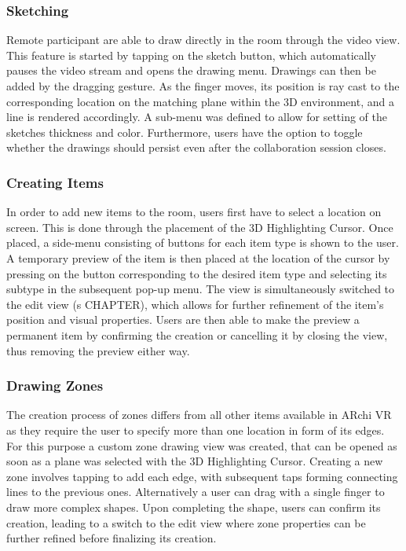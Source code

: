\documentclass{article}
\begin{document}
\subsubsection{Sketching}
Remote participant are able to draw directly in the room through the video view. This feature is started by tapping on the sketch button, which automatically pauses the video stream and opens the drawing menu. Drawings can then be added by the dragging gesture. As the finger moves, its position is ray cast to the corresponding location on the matching plane within the 3D environment, and a line is rendered accordingly. 
A sub-menu was defined to allow for setting of the sketches thickness and color. Furthermore, users have the option to toggle whether the drawings should persist even after the collaboration session closes.

\subsubsection{Creating Items}
In order to add new items to the room, users first have to select a location on screen. This is done through the placement of the 3D Highlighting Cursor. Once placed, a side-menu consisting of buttons for each item type is shown to the user. A temporary preview of the item is then placed at the location of the cursor by pressing on the button corresponding to the desired item type and selecting its subtype in the subsequent pop-up menu. 
The view is simultaneously switched to the edit view (s CHAPTER), which allows for further refinement of the item's position and visual properties. Users are then able to make the preview a permanent item by confirming the creation or cancelling it by closing the view, thus removing the preview either way.

\subsubsection{Drawing Zones}
The creation process of zones differs from all other items available in ARchi VR as they require the user to specify more than one location in form of  its edges. For this purpose a custom zone drawing view was created, that can be opened as soon as a plane was selected with the 3D Highlighting Cursor. Creating a new zone involves tapping to add each edge, with subsequent taps forming connecting lines to the previous ones. Alternatively a user can drag with a single finger to draw more complex shapes. Upon completing the shape, users can confirm its creation, leading to a switch to the edit view where zone properties can be further refined before finalizing its creation.
\end{document}
